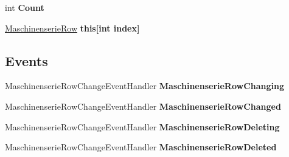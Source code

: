 \begin{DoxyCompactItemize}
\item 
int {\bfseries Count}\hypertarget{class_products_1_1_data_1_1ds_sage_1_1_maschinenserie_data_table_aac7d1609a2fc1e9210a8bbc304d4ae7d}{}\label{class_products_1_1_data_1_1ds_sage_1_1_maschinenserie_data_table_aac7d1609a2fc1e9210a8bbc304d4ae7d}

\item 
\hyperlink{class_products_1_1_data_1_1ds_sage_1_1_maschinenserie_row}{Maschinenserie\+Row} {\bfseries this\mbox{[}int index\mbox{]}}\hypertarget{class_products_1_1_data_1_1ds_sage_1_1_maschinenserie_data_table_a91c00758d555ce803662a417ff43bbe4}{}\label{class_products_1_1_data_1_1ds_sage_1_1_maschinenserie_data_table_a91c00758d555ce803662a417ff43bbe4}

\end{DoxyCompactItemize}
\subsection*{Events}
\begin{DoxyCompactItemize}
\item 
Maschinenserie\+Row\+Change\+Event\+Handler {\bfseries Maschinenserie\+Row\+Changing}\hypertarget{class_products_1_1_data_1_1ds_sage_1_1_maschinenserie_data_table_a1d72db72ca8f30b6f959c7698fc71654}{}\label{class_products_1_1_data_1_1ds_sage_1_1_maschinenserie_data_table_a1d72db72ca8f30b6f959c7698fc71654}

\item 
Maschinenserie\+Row\+Change\+Event\+Handler {\bfseries Maschinenserie\+Row\+Changed}\hypertarget{class_products_1_1_data_1_1ds_sage_1_1_maschinenserie_data_table_a499290882f24aee2858dfd5eec8a302c}{}\label{class_products_1_1_data_1_1ds_sage_1_1_maschinenserie_data_table_a499290882f24aee2858dfd5eec8a302c}

\item 
Maschinenserie\+Row\+Change\+Event\+Handler {\bfseries Maschinenserie\+Row\+Deleting}\hypertarget{class_products_1_1_data_1_1ds_sage_1_1_maschinenserie_data_table_a448f96852f82d0cb2a57237cce8ee4d1}{}\label{class_products_1_1_data_1_1ds_sage_1_1_maschinenserie_data_table_a448f96852f82d0cb2a57237cce8ee4d1}

\item 
Maschinenserie\+Row\+Change\+Event\+Handler {\bfseries Maschinenserie\+Row\+Deleted}\hypertarget{class_products_1_1_data_1_1ds_sage_1_1_maschinenserie_data_table_ae6c8b9a4cb0a7921f7e11e26762176a9}{}\label{class_products_1_1_data_1_1ds_sage_1_1_maschinenserie_data_table_ae6c8b9a4cb0a7921f7e11e26762176a9}

\end{DoxyCompactItemize}


